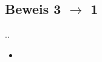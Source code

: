 \documentclass[11pt]{beamer}
\makeatletter
\newcommand*{\currentsection}{\@currentlabelname}
\makeatother
\begin{document}
\subsection{Beweis 3 $\rightarrow$ 1}
\begin{frame}{\thesection.\thesubsection. \currentsection}
\begin{itemize}
	\item 
\end{itemize}
\end{frame}
\end{document}
